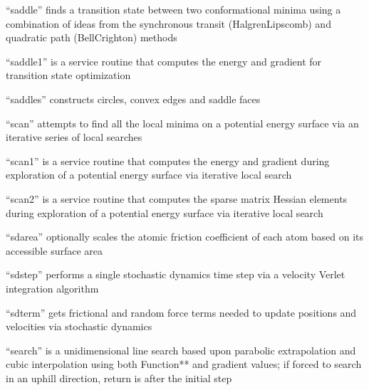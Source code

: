 \documentclass[letterpaper,11pt,english]{sphinxmanual}
\begin{document}

“saddle” finds a transition state between two conformational minima using a combination of ideas from the synchronous transit (Halgren\sphinxhyphen{}Lipscomb) and quadratic path (Bell\sphinxhyphen{}Crighton) methods


“saddle1” is a service routine that computes the energy and gradient for transition state optimization


“saddles” constructs circles, convex edges and saddle faces


“scan” attempts to find all the local minima on a potential energy surface via an iterative series of local searches


“scan1” is a service routine that computes the energy and gradient during exploration of a potential energy surface via iterative local search


“scan2” is a service routine that computes the sparse matrix Hessian elements during exploration of a potential energy surface via iterative local search


“sdarea” optionally scales the atomic friction coefficient of each atom based on its accessible surface area


“sdstep” performs a single stochastic dynamics time step via a velocity Verlet integration algorithm


“sdterm” gets frictional and random force terms needed to update positions and velocities via stochastic dynamics


“search” is a unidimensional line search based upon parabolic extrapolation and cubic interpolation using both Function** and gradient values; if forced to search in an uphill direction, return is after the initial step

\end{document}
